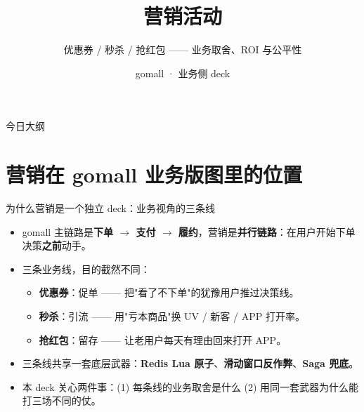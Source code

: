 \documentclass[aspectratio=169,11pt]{beamer}
\title{营销活动}
\subtitle{优惠券 / 秒杀 / 抢红包 —— 业务取舍、ROI 与公平性}
\author{gomall · 业务侧 deck}
\date{}
\begin{document}
\maketitle

\begin{frame}[shrink]{今日大纲}
\tableofcontents
\end{frame}

\section{营销在 gomall 业务版图里的位置}

\begin{frame}[shrink]{为什么营销是一个独立 deck：业务视角的三条线}
\begin{itemize}
  \item gomall 主链路是\textbf{下单 $\to$ 支付 $\to$ 履约}，营销是\textbf{并行链路}：在用户开始下单决策\textbf{之前}动手。
  \item 三条业务线，目的截然不同：
  \begin{itemize}
    \item \textbf{优惠券}：促单 —— 把"看了不下单"的犹豫用户推过决策线。
    \item \textbf{秒杀}：引流 —— 用"亏本商品"换 UV / 新客 / APP 打开率。
    \item \textbf{抢红包}：留存 —— 让老用户每天有理由回来打开 APP。
  \end{itemize}
  \item 三条线共享一套底层武器：\textbf{Redis Lua 原子}、\textbf{滑动窗口反作弊}、\textbf{Saga 兜底}。
  \item 本 deck 关心两件事：(1) 每条线的业务取舍是什么 (2) 用同一套武器为什么能打三场不同的仗。
\end{itemize}
\end{frame}
\end{document}
